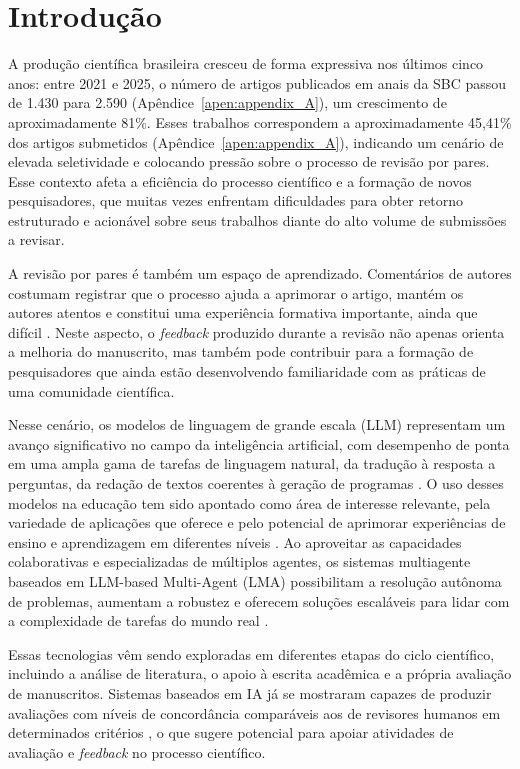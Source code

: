 \chapter{Introdução}\label{chap:introducao}


A produção científica brasileira cresceu de forma expressiva nos últimos cinco anos: entre 2021 e 2025, o número de artigos publicados em anais da SBC \cite{solsbc} passou de 1.430 para 2.590 (Apêndice~\ref{apen:appendix_A}), um crescimento de aproximadamente 81\%. Esses trabalhos correspondem a aproximadamente 45,41\% dos artigos submetidos (Apêndice~\ref{apen:appendix_A}), indicando um cenário de elevada seletividade e colocando pressão sobre o processo de revisão por pares. Esse contexto afeta a eficiência do processo científico e a formação de novos pesquisadores, que muitas vezes enfrentam dificuldades para obter retorno estruturado e acionável sobre seus trabalhos diante do alto volume de submissões a revisar.

A revisão por pares é também um espaço de aprendizado. Comentários de autores costumam registrar que o processo ajuda a aprimorar o artigo, mantém os autores atentos e constitui uma experiência formativa importante, ainda que difícil \cite{Bravo2017}. Neste aspecto, o \textit{feedback} produzido durante a revisão não apenas orienta a melhoria do manuscrito, mas também pode contribuir para a formação de pesquisadores que ainda estão desenvolvendo familiaridade com as práticas de uma comunidade científica.

Nesse cenário, os modelos de linguagem de grande escala (LLM) representam um avanço significativo no campo da inteligência artificial, com desempenho de ponta em uma ampla gama de tarefas de linguagem natural, da tradução à resposta a perguntas, da redação de textos coerentes à geração de programas \cite{Kasneci2023}. O uso desses modelos na educação tem sido apontado como área de interesse relevante, pela variedade de aplicações que oferece e pelo potencial de aprimorar experiências de ensino e aprendizagem em diferentes níveis \cite{Kasneci2023}. Ao aproveitar as capacidades colaborativas e especializadas de múltiplos agentes, os sistemas multiagente baseados em LLM-based Multi-Agent (LMA) possibilitam a resolução autônoma de problemas, aumentam a robustez e oferecem soluções escaláveis para lidar com a complexidade de tarefas do mundo real \cite{He2025}. 

Essas tecnologias vêm sendo exploradas em diferentes etapas do ciclo científico, incluindo a análise de literatura, o apoio à escrita acadêmica e a própria avaliação de manuscritos. Sistemas baseados em IA já se mostraram capazes de produzir avaliações com níveis de concordância comparáveis aos de revisores humanos em determinados critérios \cite{AgentReview}, o que sugere potencial para apoiar atividades de avaliação e \textit{feedback} no processo científico.

